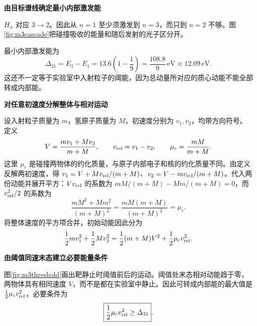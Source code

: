 \begin{solution}\textbf{由目标谱线确定最小内部激发能}\par\nobreak
\(H_\alpha\) 对应 \(3\to2\)。因此从 \(n=1\) 至少须激发到 \(n=3\)，而只到 \(n=2\) 不够。图\ref{fig:m3cascade}把碰撞吸收的能量和随后发射的光子区分开。

最小内部激发能为
\[
 \Delta_{31}=E_3-E_1=13.6\left(1-\frac19\right)
             =\frac{108.8}{9}\,\mathrm{eV}\approx12.09\,\mathrm{eV}.
\]
这还不一定等于实验室中入射粒子的阈能，因为总动量所对应的质心动能不能全部转成内部能。

 

\par\medskip{}\noindent\textbf{对任意初速度分解整体与相对运动}\par\nobreak
设入射粒子质量为 \(m\)，氢原子质量为 \(M\)，初速度分别为 \(v_1,v_2\)，均带方向符号。定义
\[
 V=\frac{mv_1+Mv_2}{m+M},\qquad
 v_{\rm rel}=v_1-v_2,\qquad
 \mu_c=\frac{mM}{m+M}.
\]
这里 \(\mu_c\) 是碰撞两物体的约化质量，与原子内部电子和核的约化质量不同。由定义反解两初速度，得 $v_1=V+Mv_{\rm rel}/(m+M)$、$v_2=V-mv_{\rm rel}/(m+M)$。代入两份动能并展开平方：$Vv_{\rm rel}$ 的系数为 $mM/(m+M)-Mm/(m+M)=0$，而 $v_{\rm rel}^2/2$ 的系数为
\[
 \frac{mM^2+Mm^2}{(m+M)^2}
 =\frac{mM(m+M)}{(m+M)^2}=\mu_c.
\]
将整体速度的平方项合并，初始动能因此分为
\[
 \frac12mv_1^2+\frac12Mv_2^2
 =\frac12(m+M)V^2+\frac12\mu_c v_{\rm rel}^2.
\]


\par\medskip{}\noindent\textbf{由阈值同速末态建立必要能量条件}\par\nobreak
图\ref{fig:m3threshold}画出靶静止时阈值前后的运动。阈值处末态相对动能趋于零，两物体具有相同速度 \(V\)，而不是都在实验室中静止。因此可转成内部能的最大值是 \(\frac12\mu_c v_{\rm rel}^2\)，必要条件为
\[
 \boxed{\frac12\mu_c v_{\rm rel}^2\ge\Delta_{31}}.
\]


\end{solution}
